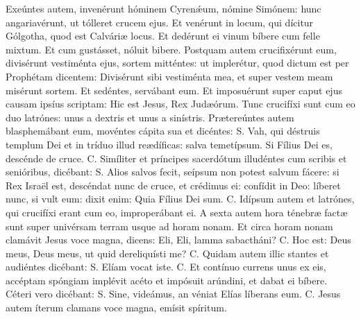 \begin{paracol}{2}
{Exeúntes autem, invenérunt hóminem Cyrenǽum, nómine Simónem: hunc angariavérunt, ut tólleret crucem ejus. Et venérunt in locum, qui dícitur Gólgotha, quod est Calváriæ locus. Et dedérunt ei vinum bíbere cum felle mixtum. Et cum gustásset, nóluit bibere. Postquam autem crucifixérunt eum, divisérunt vestiménta ejus, sortem mitténtes: ut implerétur, quod dictum est per Prophétam dicentem: Divisérunt sibi vestiménta mea, et super vestem meam misérunt sortem. Et sedéntes, servábant eum. Et imposuérunt super caput ejus causam ipsíus scriptam: Hic est Jesus, Rex Judæórum. Tunc crucifíxi sunt cum eo duo latrónes: unus a dextris et unus a sinístris. Prætereúntes autem blasphemábant eum, movéntes cápita sua et dicéntes: {\redx S.} Vah, qui déstruis templum Dei et in tríduo illud reædíficas: salva temetípsum. Si Fílius Dei es, descénde de cruce. {\redx C.} Simíliter et príncipes sacerdótum illudéntes cum scribis et senióribus, dicébant: {\redx S.} Alios salvos fecit, seípsum non potest salvum fácere: si Rex Israël est, descéndat nunc de cruce, et crédimus ei: confídit in Deo: líberet nunc, si vult eum: dixit enim: Quia Fílius Dei sum. {\redx C.} Idípsum autem et latrónes, qui crucifíxi erant cum eo, improperábant ei. A sexta autem hora ténebræ factæ sunt super univérsam terram usque ad horam nonam. Et circa horam nonam clamávit Jesus voce magna, dicens: \cruz Eli, Eli, lamma sabactháni? {\redx C.} Hoc est: \cruz Deus meus, Deus meus, ut quid dereliquísti me? {\redx C.} Quidam autem illic stantes et audiéntes dicébant: {\redx S.} Elíam vocat iste. {\redx C.} Et contínuo currens unus ex eis, accéptam spóngiam implévit acéto et impósuit arúndini, et dabat ei bíbere. Céteri vero dicébant: {\redx S.} Sine, videámus, an véniat Elías líberans eum. {\redx C.} Jesus autem íterum clamans voce magna, emísit spíritum.
}\switchcolumn\portugues{
}
\end{paracol}
